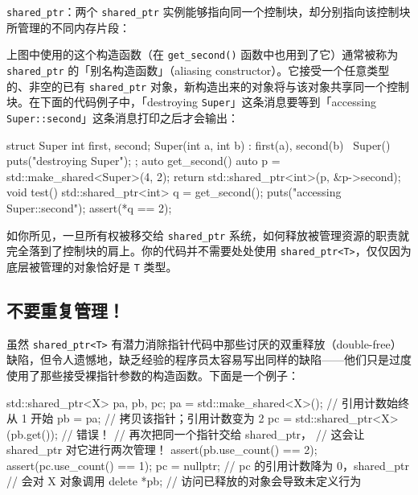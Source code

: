 \texttt{shared\_\allowbreak{}ptr}：两个 \texttt{shared\_\allowbreak{}ptr} 实例能够指向同一个控制块，却分别指向该控制块所管理的不同内存片段：


上图中使用的这个构造函数（在 \texttt{get\_\allowbreak{}second(\allowbreak{})\allowbreak{}} 函数中也用到了它）通常被称为 \texttt{shared\_\allowbreak{}ptr} 的「别名构造函数」（aliasing constructor）。它接受一个任意类型的、非空的已有 \texttt{shared\_\allowbreak{}ptr} 对象，新构造出来的对象将与该对象共享同一个控制块。在下面的代码例子中，「destroying \texttt{Super}」这条消息要等到「accessing \texttt{Super::\allowbreak{}second}」这条消息打印之后才会输出：

\begin{codebox}[cpp]
    struct Super {
      int first, second;
      Super(int a, int b) : first(a), second(b) {}
      ~Super() { puts("destroying Super"); }
    };
    auto get_second() {
      auto p = std::make_shared<Super>(4, 2);
      return std::shared_ptr<int>(p, &p->second);
    }
    void test() {
      std::shared_ptr<int> q = get_second();
      puts("accessing Super::second");
      assert(*q == 2);
    }
\end{codebox}

如你所见，一旦所有权被移交给 \texttt{shared\_\allowbreak{}ptr} 系统，如何释放被管理资源的职责就完全落到了控制块的肩上。你的代码并不需要处处使用 \texttt{shared\_\allowbreak{}ptr<\allowbreak{}T>\allowbreak{}}，仅仅因为底层被管理的对象恰好是 \texttt{T} 类型。

\subsection{不要重复管理！}

虽然 \texttt{shared\_\allowbreak{}ptr<\allowbreak{}T>\allowbreak{}} 有潜力消除指针代码中那些讨厌的双重释放（double-free）缺陷，但令人遗憾地，缺乏经验的程序员太容易写出同样的缺陷——他们只是过度使用了那些接受裸指针参数的构造函数。下面是一个例子：

\begin{codebox}[cpp]
    std::shared_ptr<X> pa, pb, pc;
    pa = std::make_shared<X>();
      // 引用计数始终从 1 开始
    pb = pa;
      // 拷贝该指针；引用计数变为 2
    pc = std::shared_ptr<X>(pb.get()); // 错误！
      // 再次把同一个指针交给 shared_ptr，
      // 这会让 shared_ptr 对它进行两次管理！
    assert(pb.use_count() == 2);
    assert(pc.use_count() == 1);
    pc = nullptr;
      // pc 的引用计数降为 0，shared_ptr
      // 会对 X 对象调用 delete
    *pb; // 访问已释放的对象会导致未定义行为
\end{codebox}

